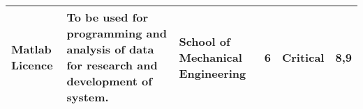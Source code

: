 \begin{table}[]
{\begin{tabular}{|p{4cm}|p{12cm}|p{8cm}|r|r|r|}
Matlab Licence                             & To be used for programming and analysis of data for research and development of system.                                                                                        & School of Mechanical Engineering                                                                             &  6                               & Critical                                  & 8,9                                        \\ \hline
\end{tabular}
}
\end{table}